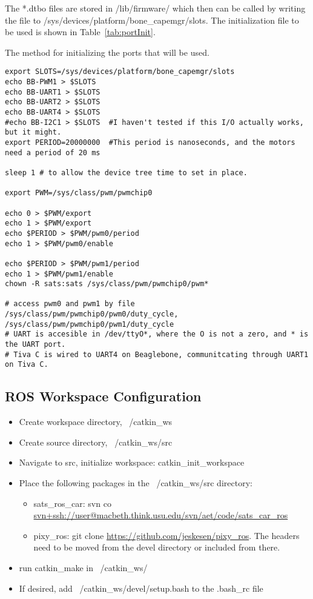 \documentclass{article}
\begin{document}
The *.dtbo files are stored in /lib/firmware/ which then can be called by writing the file to /sys/devices/platform/bone\_capemgr/slots. The initialization file to be used is shown in Table~\ref{tab:portInit}.  
\begin{table}
    \caption{The method for initializing the ports that will be used.}
    \label{tab:portInit}
\begin{lstlisting}
export SLOTS=/sys/devices/platform/bone_capemgr/slots
echo BB-PWM1 > $SLOTS
echo BB-UART1 > $SLOTS
echo BB-UART2 > $SLOTS
echo BB-UART4 > $SLOTS
#echo BB-I2C1 > $SLOTS  #I haven't tested if this I/O actually works, but it might.
export PERIOD=20000000  #This period is nanoseconds, and the motors need a period of 20 ms

sleep 1 # to allow the device tree time to set in place. 

export PWM=/sys/class/pwm/pwmchip0

echo 0 > $PWM/export
echo 1 > $PWM/export
echo $PERIOD > $PWM/pwm0/period
echo 1 > $PWM/pwm0/enable

echo $PERIOD > $PWM/pwm1/period
echo 1 > $PWM/pwm1/enable
chown -R sats:sats /sys/class/pwm/pwmchip0/pwm*

# access pwm0 and pwm1 by file /sys/class/pwm/pwmchip0/pwm0/duty_cycle,  /sys/class/pwm/pwmchip0/pwm1/duty_cycle
# UART is accesible in /dev/ttyO*, where the O is not a zero, and * is the UART port.
# Tiva C is wired to UART4 on Beaglebone, communitcating through UART1 on Tiva C. 
\end{lstlisting}
\end{table}


\subsection{ROS Workspace Configuration}
\begin{itemize}
    \item Create workspace directory, ~/catkin\_ws
    \item Create source directory, ~/catkin\_ws/src
    \item Navigate to src, initialize workspace: catkin\_init\_workspace
    \item Place the following packages in the ~/catkin\_ws/src directory:
        \begin{itemize}
            \item sats\_ros\_car: svn co \url{svn+ssh://user@macbeth.think.usu.edu/svn/aet/code/sats_car_ros}
            \item pixy\_ros: git clone \url{https://github.com/jeskesen/pixy_ros}. The headers need to be moved from the devel directory or included from there. 
        \end{itemize}
    \item run catkin\_make in ~/catkin\_ws/ 
    \item If desired, add ~/catkin\_ws/devel/setup.bash to the .bash\_rc file
\end{itemize}
\end{document}
